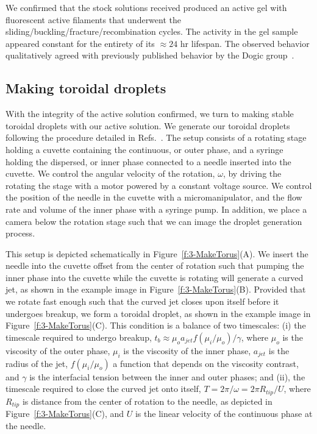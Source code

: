 We confirmed that the stock solutions received produced an active gel with fluorescent active filaments that underwent the sliding/buckling/fracture/recombination cycles.
The activity in the gel sample appeared constant for the entirety of its  $\approx 24$ hr lifespan.
The observed behavior qualitatively agreed with previously published behavior by the Dogic group~\cite{RN3}.


\subsection{Making toroidal droplets}
With the integrity of the active solution confirmed, we turn to making stable toroidal droplets with our active solution.
We generate our toroidal droplets following the procedure detailed in Refs.~\cite{RN29,RN47,RN257}.
The setup consists of a rotating stage holding a cuvette containing the continuous, or outer phase, and a syringe holding the dispersed, or inner phase connected to a needle inserted into the cuvette.
We control the angular velocity of the rotation, $\omega$, by driving the rotating the stage with a motor powered by a constant voltage source.
We control the position of the needle in the cuvette with a micromanipulator, and the flow rate and volume of the inner phase with a syringe pump.
In addition, we place a camera below the rotation stage such that we can image the droplet generation process.

This setup is depicted schematically in Figure~\ref{f:3-MakeTorus}(A).
We insert the needle into the cuvette offset from the center of rotation such that pumping the inner phase into the cuvette while the cuvette is rotating will generate a curved jet, as shown in the example image in Figure~\ref{f:3-MakeTorus}(B).
Provided that we rotate fast enough such that the curved jet closes upon itself before it undergoes breakup, we form a toroidal droplet, as shown in the example image in Figure~\ref{f:3-MakeTorus}(C).
This condition is a balance of two timescales: (i) the timescale required to undergo breakup, $t_b \approx \mu_o a_{jet} f(\mu_i/\mu_o)/\gamma$, where $\mu_o$ is the viscosity of the outer phase, $\mu_i$ is the viscosity of the inner phase, $a_{jet}$ is the radius of the jet, $f(\mu_i/\mu_o)$ a function that depends on the viscosity contrast, and $\gamma$ is the interfacial tension between the inner and outer phases;
  and (ii), the timescale required to close the curved jet onto itself, $T = 2\pi/\omega = 2 \pi R_{tip}/U$, where $R_{tip}$ is distance from the center of rotation to the needle, as depicted in Figure~\ref{f:3-MakeTorus}(C), and $U$ is the linear velocity of the continuous phase at the needle.

